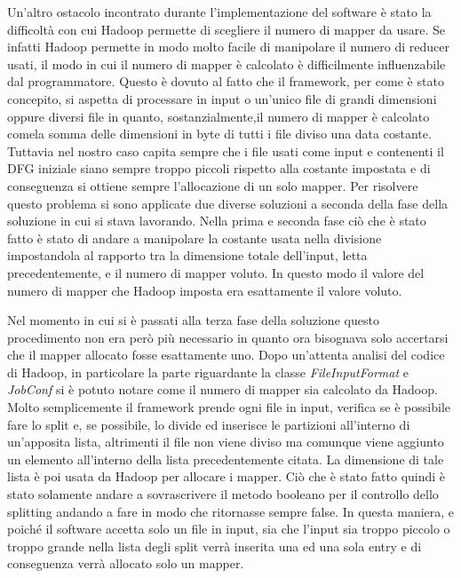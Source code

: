 \documentclass[]{IEEEtran}
\begin{document}
Un'altro ostacolo incontrato durante l'implementazione del software è stato la difficoltà con cui Hadoop permette di scegliere il numero di mapper da usare. Se infatti Hadoop permette in modo molto facile di manipolare il numero di reducer usati, il modo in cui il numero di mapper è calcolato è difficilmente influenzabile dal programmatore. Questo è dovuto al fatto che il framework, per come è stato concepito, si aspetta di processare in input o un'unico file di grandi dimensioni oppure diversi file in quanto, sostanzialmente,il numero di mapper è calcolato comela somma delle dimensioni in byte di tutti i file diviso una data costante. Tuttavia nel nostro caso capita sempre che i file usati come input e contenenti il DFG iniziale siano sempre troppo piccoli rispetto alla costante impostata e di conseguenza si ottiene sempre l'allocazione di un solo mapper. Per risolvere questo problema si sono applicate due diverse soluzioni a seconda della fase della soluzione in cui si stava lavorando. Nella prima e seconda fase ciò che è stato fatto è stato di andare a manipolare la costante usata nella divisione impostandola al rapporto tra la dimensione totale dell'input, letta precedentemente, e il numero di mapper voluto. In questo modo il valore del numero di mapper che Hadoop imposta era esattamente il valore voluto.

Nel momento in cui si è passati alla terza fase della soluzione questo procedimento non era però più necessario in quanto ora bisognava solo accertarsi che il mapper allocato fosse esattamente uno. Dopo un'attenta analisi del codice di Hadoop, in particolare la parte riguardante la classe \emph{FileInputFormat}\cite{FILEINPUTFORMAT} e \emph{JobConf}\cite{JOBCONF} si è potuto notare come il numero di mapper sia calcolato da Hadoop. Molto semplicemente il framework prende ogni file in input, verifica se è possibile fare lo split e, se possibile, lo divide ed inserisce le partizioni all'interno di un'apposita lista, altrimenti il file non viene diviso ma comunque viene aggiunto un elemento all'interno della lista precedentemente citata. La dimensione di tale lista è poi usata da Hadoop per allocare i mapper. Ciò che è stato fatto quindi è stato solamente andare a sovrascrivere il metodo booleano per il controllo dello splitting andando a fare in modo che ritornasse sempre false. In questa maniera, e poiché il software accetta solo un file in input, sia che l'input sia troppo piccolo o troppo grande nella lista degli split verrà inserita una ed una sola entry e di conseguenza verrà allocato solo un mapper.
\end{document}
